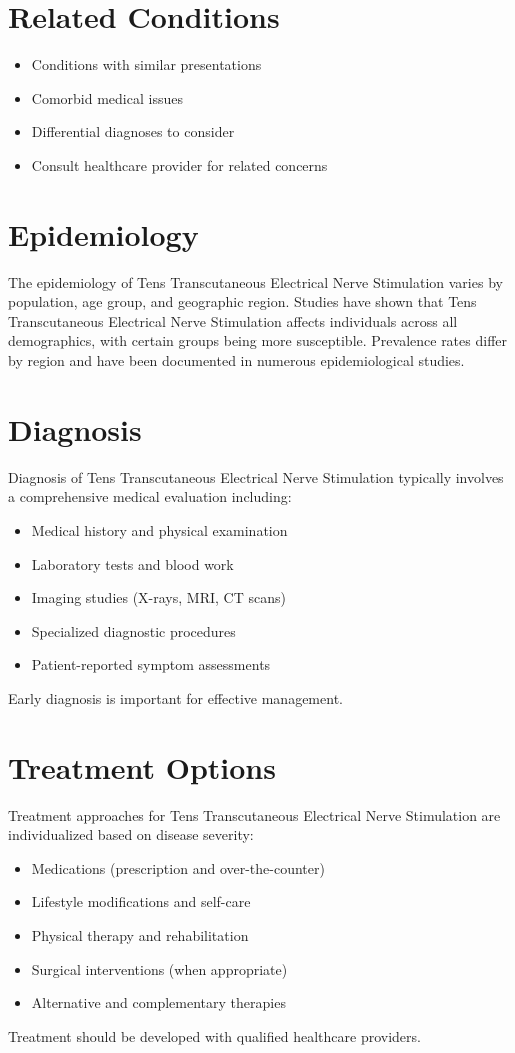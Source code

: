 \section*{Related Conditions}
\begin{itemize}
  \item Conditions with similar presentations
  \item Comorbid medical issues
  \item Differential diagnoses to consider
  \item Consult healthcare provider for related concerns
\end{itemize}

\section*{Epidemiology}
The epidemiology of Tens Transcutaneous Electrical Nerve Stimulation varies by population, age group, and geographic region. Studies have shown that Tens Transcutaneous Electrical Nerve Stimulation affects individuals across all demographics, with certain groups being more susceptible. Prevalence rates differ by region and have been documented in numerous epidemiological studies.

\section*{Diagnosis}
Diagnosis of Tens Transcutaneous Electrical Nerve Stimulation typically involves a comprehensive medical evaluation including:
\begin{itemize}
  \item Medical history and physical examination
  \item Laboratory tests and blood work
  \item Imaging studies (X-rays, MRI, CT scans)
  \item Specialized diagnostic procedures
  \item Patient-reported symptom assessments
\end{itemize}
Early diagnosis is important for effective management.

\section*{Treatment Options}
Treatment approaches for Tens Transcutaneous Electrical Nerve Stimulation are individualized based on disease severity:
\begin{itemize}
  \item Medications (prescription and over-the-counter)
  \item Lifestyle modifications and self-care
  \item Physical therapy and rehabilitation
  \item Surgical interventions (when appropriate)
  \item Alternative and complementary therapies
\end{itemize}
Treatment should be developed with qualified healthcare providers.

